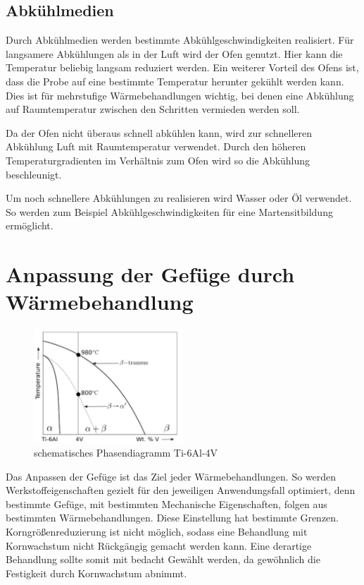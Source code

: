 \documentclass[a4paper, 11pt]{tubsreprt}
\begin{document}
\subsection{Abkühlmedien}

Durch Abkühlmedien werden bestimmte Abkühlgeschwindigkeiten realisiert. Für langsamere Abkühlungen als in der Luft wird der Ofen genutzt. Hier kann die Temperatur beliebig langsam reduziert werden. Ein weiterer Vorteil des Ofens ist, dass die Probe auf eine bestimmte Temperatur herunter gekühlt werden kann. Dies ist für mehrstufige Wärmebehandlungen wichtig, bei denen eine Abkühlung auf Raumtemperatur zwischen den Schritten vermieden werden soll. 

Da der Ofen nicht überaus schnell abkühlen kann, wird zur schnelleren Abkühlung Luft mit Raumtemperatur verwendet. Durch den höheren Temperaturgradienten im Verhältnis zum Ofen wird so die Abkühlung beschleunigt.  

Um noch schnellere Abkühlungen zu realisieren wird Wasser oder Öl verwendet. So werden zum Beispiel Abkühlgeschwindigkeiten für eine Martensitbildung ermöglicht.
\section{Anpassung der Gefüge durch Wärmebehandlung}

\begin{figure}
	\centering
	\includegraphics[width=0.5\textwidth]{Bilder/Phasendiagram.PNG}
	\caption[Phasendiagramm]{schematisches Phasendiagramm Ti-6Al-4V \cite{Babu2008}}
	\label{Phasendiagram}
\end{figure}
Das Anpassen der Gefüge ist das Ziel jeder Wärmebehandlungen. So werden Werkstoffeigenschaften gezielt für den jeweiligen Anwendungsfall optimiert, denn bestimmte Gefüge, mit bestimmten Mechanische Eigenschaften, folgen aus bestimmten Wärmebehandlungen. Diese Einstellung hat bestimmte Grenzen. Korngrößenreduzierung ist nicht möglich, sodass eine Behandlung mit Kornwachstum nicht Rückgängig gemacht werden kann. Eine derartige Behandlung sollte somit mit bedacht Gewählt werden, da gewöhnlich die Festigkeit durch Kornwachstum abnimmt.
\end{document}
